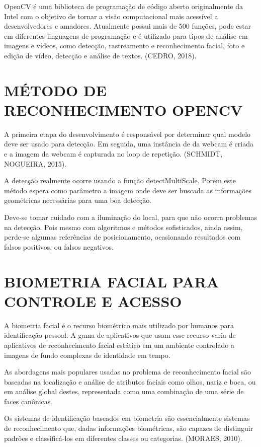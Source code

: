 OpenCV é uma biblioteca de programação de código aberto originalmente da Intel com o objetivo de tornar a visão computacional mais acessível a desenvolvedores e amadores. Atualmente possui mais de 500 funções, pode estar em diferentes linguagens de programação e é utilizado para tipos de análise em imagens e vídeos, como detecção, rastreamento e reconhecimento facial, foto e edição de vídeo, detecção e análise de textos. (CEDRO, 2018).

\section{MÉTODO DE RECONHECIMENTO OPENCV}\label{sec:formatacaoTexto}

A primeira etapa do desenvolvimento é responsável por determinar qual modelo deve ser usado para detecção. Em seguida, uma instância de da webcam é criada e a imagem da webcam é capturada no loop de repetição.  (SCHMIDT, NOGUEIRA, 2015). 

A detecção realmente ocorre usando a função detectMultiScale. Porém este método espera como parâmetro a imagem onde deve ser buscada as informações geométricas necessárias para uma boa detecção.

Deve-se tomar cuidado com a iluminação do local, para que não ocorra problemas na detecção. Pois mesmo com algoritmos e métodos sofisticados, ainda assim, perde-se algumas referências de posicionamento, ocasionando resultados com falsos positivos, ou falsos negativos.

\section{BIOMETRIA FACIAL PARA CONTROLE E ACESSO}\label{sec:formatacaoTexto}

A biometria facial é o recurso biométrico mais utilizado por humanos para identificação pessoal. A gama de aplicativos que usam esse recurso varia de aplicativos de reconhecimento facial estático em um ambiente controlado a imagens de fundo complexas de identidade em tempo.

As abordagens mais populares usadas no problema de reconhecimento facial são baseadas na localização e análise de atributos faciais como olhos, nariz e boca, ou em análise global destes, representada como uma combinação de uma série de faces canônicas.

Os sistemas de identificação baseados em biometria são essencialmente sistemas de reconhecimento que, dadas informações biométricas, são capazes de distinguir padrões e classificá-los em diferentes classes ou categorias.  (MORAES, 2010).


